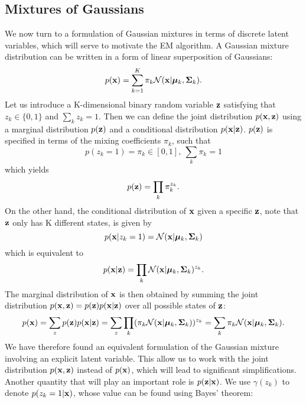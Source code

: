 \documentclass[../book-template.tex]{subfiles}
\begin{document}
\subsection{Mixtures of Gaussians}
We now turn to a formulation of Gaussian mixtures in terms of discrete latent variables, which will serve to motivate the EM algorithm. A Gaussian mixture distribution can be written in a form of linear superposition of Gaussians:
\begin{equation*}
	p({\bf x})=\sum_{k=1}^{K} \pi_k \mathcal{N}({\bf x}|\bm{\mu}_k, {\bf\Sigma}_k).
\end{equation*}
Let us introduce a K-dimensional binary random variable ${\bf z}$ satisfying that $z_k\in \{0,1\}$ and $\sum_k z_k=1$. Then we can define the joint distribution $p({\bf x,z})$ using a marginal distribution $p({\bf z})$ and a conditional distribution $p({\bf x}|{\bf z})$. $p({\bf z})$ is specified in terms of the mixing coefficients $\pi_k$, such that
\begin{equation*}
	p(z_k=1)=\pi_k \in [0,1],\ \sum_k\pi_k=1
\end{equation*}
which yields
\begin{equation*}
	p({\bf z})=\prod_{k}\pi_k^{z_k}.
\end{equation*}
On the other hand, the conditional distribution of ${\bf x}$ given a specific ${\bf z}$, note that ${\bf z}$ only has K different states, is given by
\begin{equation*}
	p({\bf x}|z_k=1)=\mathcal{N}({\bf x}|\bm{\mu}_k,{\bf \Sigma}_k)
\end{equation*}
which is equivalent to
\begin{equation*}
	p({\bf x}|{\bf z}) = \prod_k \mathcal{N}({\bf x}|\bm{\mu}_k,{\bf \Sigma}_k)^{z_k}.
\end{equation*}
The marginal distribution of ${\bf x}$ is then obtained by summing the joint distribution $p({\bf x,z})=p({\bf z})p({\bf x}|{\bf z})$ over all possible states of ${\bf z}$:
\begin{equation*}
	p({\bf x}) = \sum_z p({\bf z})p({\bf x}|{\bf z}) =  \sum_z \prod_k (\pi_k \mathcal{N}({\bf x}|\bm{\mu}_k,{\bf \Sigma}_k))^{z_k} = \sum_{k} \pi_k \mathcal{N}({\bf x}|\bm{\mu}_k, {\bf\Sigma}_k).
\end{equation*}
We have therefore found an equivalent formulation of the Gaussian mixture involving an explicit latent variable. This allow us to work with the joint distribution $p({\bf x, z})$ instead of $p({\bf x})$, which will lead to significant simplifications. Another quantity that will play an important role is $p({\bf z|x})$. We use $\gamma(z_k)$ to denote $p(z_k=1|{\bf x})$, whose value can be found using Bayes' theorem:
\end{document}
